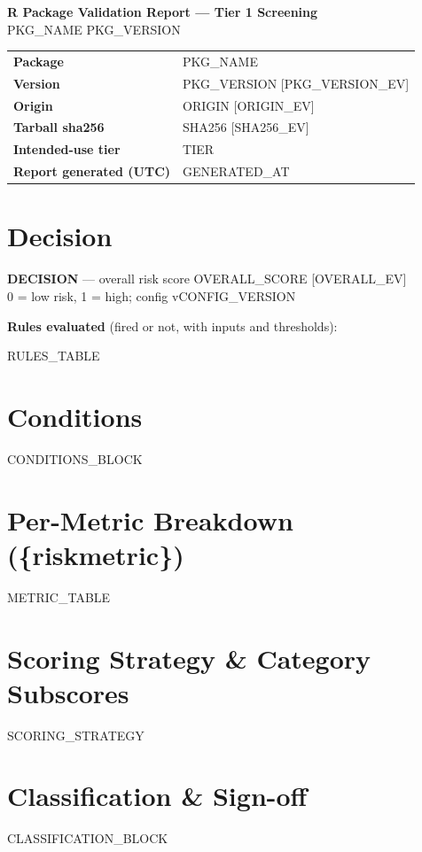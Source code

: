 \documentclass[10pt]{article}
\begin{document}
\begin{center}
{\Large\bfseries R Package Validation Report --- Tier 1 Screening}\\[4pt]
{\large {{PKG_NAME}} {{PKG_VERSION}}}
\end{center}

\begin{tabular}{@{}p{4cm}p{11cm}@{}}
\textbf{Package} & {{PKG_NAME}} \\
\textbf{Version} & {{PKG_VERSION}} [{{PKG_VERSION_EV}}] \\
\textbf{Origin} & {{ORIGIN}} [{{ORIGIN_EV}}] \\
\textbf{Tarball sha256} & {\footnotesize {{SHA256}}} [{{SHA256_EV}}] \\
\textbf{Intended-use tier} & {{TIER}} \\
\textbf{Report generated (UTC)} & {{GENERATED_AT}} \\
\end{tabular}

\section*{Decision}
\begin{center}
{\large\bfseries {{DECISION}}} --- overall risk score {{OVERALL_SCORE}} [{{OVERALL_EV}}]\\
{\small 0 = low risk, 1 = high; config v{{CONFIG_VERSION}}}
\end{center}

\textbf{Rules evaluated} (fired or not, with inputs and thresholds):

{{RULES_TABLE}}

\section*{Conditions}
{{CONDITIONS_BLOCK}}

\section*{Per-Metric Breakdown (\{riskmetric\})}
{{METRIC_TABLE}}

\section*{Scoring Strategy \& Category Subscores}
{{SCORING_STRATEGY}}

\section*{Classification \& Sign-off}
{{CLASSIFICATION_BLOCK}}
\end{document}

